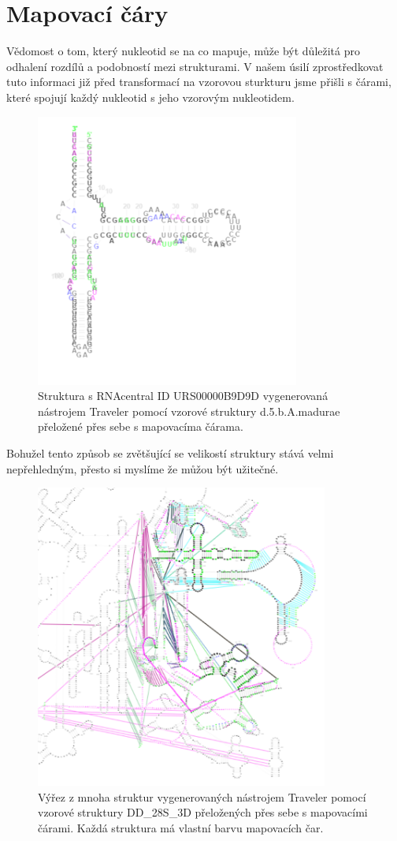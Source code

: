 \section{Mapovací čáry}

Vědomost o tom, který nukleotid se na co mapuje, může být důležitá pro odhalení
rozdílů a podobností mezi strukturami. V našem úsilí zprostředkovat tuto
informaci již před transformací na vzorovou sturkturu jsme přišli s čárami,
které spojují každý nukleotid s jeho vzorovým nukleotidem.

\begin{figure}[H]
  \centering
  \includegraphics[height=90mm]{../img/kap02/mappingLines/small.png}
  \caption{Struktura s RNAcentral ID URS00000B9D9D vygenerovaná nástrojem
  Traveler pomocí vzorové struktury d.5.b.A.madurae přeložené přes sebe s
  mapovacíma čárama.}
\end{figure}

Bohužel tento způsob se zvětšující se velikostí struktury stává velmi
nepřehledným, přesto si myslíme že můžou být užitečné.

\begin{figure}[H]
  \centering
  \includegraphics[height=100mm]{../img/kap02/mappingLines/big.png}
  \caption{Výřez z mnoha struktur vygenerovaných nástrojem Traveler pomocí vzorové struktury DD\_28S\_3D přeložených přes sebe s mapovacími čárami.
  Každá struktura má vlastní barvu mapovacích čar.}
\end{figure}

